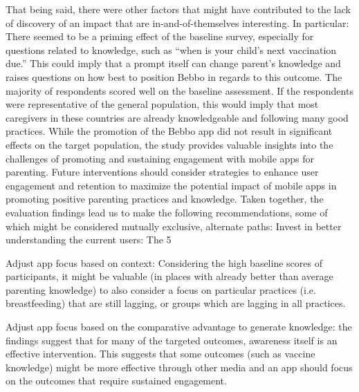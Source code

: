 \documentclass{article}
\begin{document}
That being said, there were other factors that might have contributed to the lack of discovery of an impact that are in-and-of-themselves interesting. In particular:
There seemed to be a priming effect of the baseline survey, especially for questions related to knowledge, such as “when is your child’s next vaccination due.” This could imply that a prompt itself can change parent’s knowledge and raises questions on how best to position Bebbo in regards to this outcome.
The majority of respondents scored well on the baseline assessment. If the respondents were representative of the general population, this would imply that most caregivers in these countries are already knowledgeable and following many good practices.
While the promotion of the Bebbo app did not result in significant effects on the target population, the study provides valuable insights into the challenges of promoting and sustaining engagement with mobile apps for parenting. Future interventions should consider strategies to enhance user engagement and retention to maximize the potential impact of mobile apps in promoting positive parenting practices and knowledge.
Taken together, the evaluation findings lead us to make the following recommendations, some of which might be considered mutually exclusive, alternate paths:
 Invest in better understanding the current users: The 5%

Adjust app focus based on context: Considering the high baseline scores of participants, it might be valuable (in places with already better than average parenting knowledge) to also consider a focus on particular practices (i.e. breastfeeding) that are still lagging, or groups which are lagging in all practices.

Adjust app focus based on the comparative advantage to generate knowledge: the findings suggest that for many of the targeted outcomes, awareness itself is an effective intervention. This suggests that some outcomes (such as vaccine knowledge) might be more effective through other media and an app should focus on the outcomes that require sustained engagement.
\end{document}
